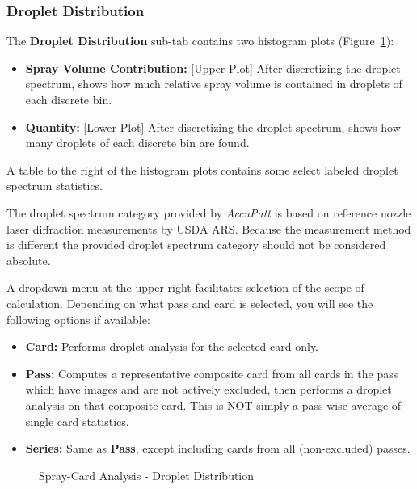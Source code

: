 \documentclass[10pt,letterpaper,titlepage]{article}
\begin{document}
    \subsubsection{Droplet Distribution}
    The \textbf{Droplet Distribution} sub-tab contains two histogram plots (Figure~\ref{fig:card_droplet_dist}):
    \begin{itemize}
        \item \textbf{Spray Volume Contribution:} [Upper Plot] After discretizing the droplet spectrum, shows how much relative spray volume is contained in droplets of each discrete bin.
        \item \textbf{Quantity:} [Lower Plot] After discretizing the droplet spectrum, shows how many droplets of each discrete bin are found.
    \end{itemize}
    A table to the right of the histogram plots contains some select labeled droplet spectrum statistics.\par
    \color{red} The droplet spectrum category provided by \textit{AccuPatt} is based on reference nozzle laser diffraction measurements by USDA ARS. Because the measurement method is different the provided droplet spectrum category should not be considered absolute.\color{black}\par
    A dropdown menu at the upper-right facilitates selection of the scope of calculation. Depending on what pass and card is selected, you will see the following options if available:
    \begin{itemize}
        \item \textbf{Card:} Performs droplet analysis for the selected card only.
        \item \textbf{Pass:} Computes a representative composite card from all cards in the pass which have images and are not actively excluded, then performs a droplet analysis on that composite card. This is NOT simply a pass-wise average of single card statistics.
        \item \textbf{Series:} Same as \textbf{Pass}, except including cards from all (non-excluded) passes.
    \end{itemize}
    \begin{figure}[hb]
        \centering
        \caption{Spray-Card Analysis - Droplet Distribution}
        \label{fig:card_droplet_dist}
    \end{figure}
\end{document}
